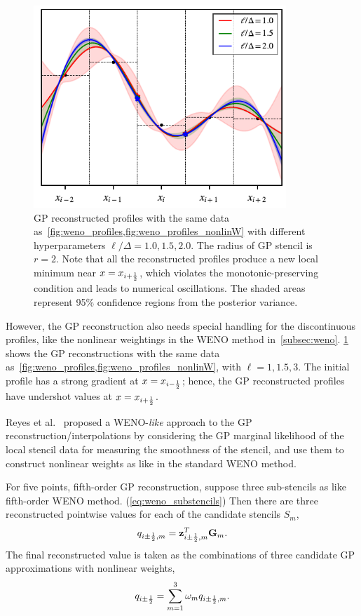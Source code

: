 \begin{figure}
    \centering
    \includegraphics[width=0.85\textwidth]{fig/gp_linear_recon}
    \caption{GP reconstructed profiles with the same data as~\cref{fig:weno_profiles,fig:weno_profiles_nonlinW}
        with different hyperparameters \( \ell/\Delta = 1.0, 1.5, 2.0 \). The radius of GP stencil is \( r=2 \).
        Note that all the reconstructed profiles produce a new local minimum near \( x = x_{{i+\frac{1}{2}}} \),
        which violates the monotonic-preserving condition and leads to numerical oscillations.
        The shaded areas represent 95\% confidence regions from the posterior variance.
    }\label{fig:gp_linear_recon}
\end{figure}

However, the GP reconstruction also needs special handling for the discontinuous profiles,
like the nonlinear weightings in the WENO method in~\cref{subsec:weno}.
\cref{fig:gp_linear_recon} shows the GP reconstructions with the same data as~\cref{fig:weno_profiles,fig:weno_profiles_nonlinW},
with \( \ell = 1, 1.5, 3 \). The initial profile has a strong gradient at \( x = x_{{i-\frac{1}{2}}} \);
hence, the GP reconstructed profiles have undershot values at \( x = x_{{i+\frac{1}{2}}} \).

Reyes et al.~\cite{reyes2019variable} proposed a WENO-\textit{like} approach to
the GP reconstruction/interpolations by considering the GP marginal likelihood of the local stencil data
for measuring the smoothness of the stencil,
and use them to construct nonlinear weights as like in the standard WENO method.

For five points, fifth-order GP reconstruction, suppose three sub-stencils as like fifth-order WENO method. (\cref{eq:weno_substencils})
Then there are three reconstructed pointwise values for each of the candidate stencils \( S_{m} \),
\begin{equation}\label{eq:gp_weno_candidates}
    q_{i \pm \frac{1}{2}, m} = \mathbf{z}_{i \pm \frac{1}{2}, m}^{T} \mathbf{G}_{m}.
\end{equation}
The final reconstructed value is taken as the combinations of three candidate GP approximations with nonlinear weights,
\begin{equation}\label{eq:gp_weno_comb}
    q_{i \pm \frac{1}{2}} = \sum_{m = 1}^{3} \omega_{m} q_{i \pm \frac{1}{2}, m}.
\end{equation}

